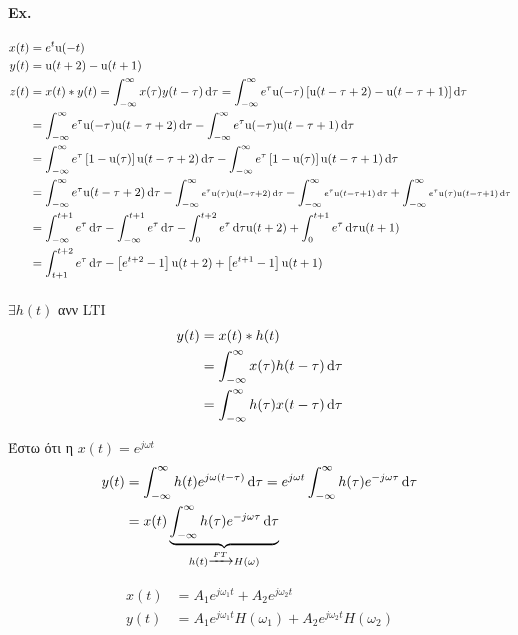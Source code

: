 	\paragraph{Ex.}
	\begin{align*}
	x(t) &= e^t\mathrm u(-t) \\
	y(t) &= \mathrm u(t+2)-\mathrm u(t+1) \\
	z(t) &= x(t) * y(t) = \int_{-\infty}^{\infty} x(\tau)y(t-\tau)\dif\tau
	= \int_{-\infty}^{\infty} e^\tau\mathrm u(-\tau)\left[
	\mathrm u(t-\tau+2)-\mathrm u(t-\tau+1)
	\right]\dif\tau
	\\ &= \int_{-\infty}^{\infty} e^\tau
	\mathrm u(-\tau)\mathrm u(t-\tau+2)\dif\tau - \int_{-\infty}^{\infty}
	e^\tau \mathrm u(-\tau)\mathrm u(t-\tau+1)\dif\tau
	\\ &= \int_{-\infty}^{\infty} e^\tau
	\left[ 1-\mathrm u(\tau) \right]\mathrm u(t-\tau+2)\dif\tau -
	\int_{-\infty}^{\infty} e^\tau \left[ 1-\mathrm u(\tau) \right]
	\mathrm u(t-\tau+1)\dif\tau
	\\ &= \int_{-\infty}^{\infty}
	\mathsmaller{e^\tau \mathrm u(t-\tau+2)\dif\tau}
	- \int_{-\infty}^{\infty}
	\mathsmaller{\mathsmaller{
		 e^\tau \mathrm u(\tau) \mathrm u(t-\tau+2)\dif\tau}}
	- \int_{-\infty}^{\infty}
	\mathsmaller{\mathsmaller{ e^\tau \mathrm u(t-\tau+1)\dif\tau}}
	+ \int_{-\infty}^{\infty}\mathsmaller{\mathsmaller{
		 e^\tau \mathrm u(\tau)\mathrm u(t-\tau+1)\dif\tau}}
	\\ &= \int_{-\infty}^{t+1} e^\tau\dif\tau - \int_{-\infty}^{t+1}e^\tau\dif\tau
	- \int_0^{t+2}e^\tau\dif\tau\mathrm u(t+2)
	+ \int_0^{t+1}e^\tau\dif\tau \mathrm u(t+1)
	\\ &= \int_{t+1}^{t+2}e^\tau\dif\tau
	-\left[ e^{t+2}-1 \right]\mathrm u(t+2)
	+\left[ e^{t+1}-1 \right]\mathrm u(t+1)
	\end{align*}

	\vspace{1cm}
	\paragraph{}
	\( \exists h(t) \) ανν LTI
	\begin{align*}
		y(t) &= x(t)*h(t) \\ &=\int_{-\infty}^{\infty} x(\tau)h(t-\tau)\mathop{}\!\mathrm{d}\tau
		\\ &= \int_{-\infty}^{\infty} h(\tau)x(t-\tau)\mathop{}\!\mathrm{d}\tau
	\end{align*}

	Έστω ότι η \( x(t) = e^{j\omega t} \)
	\begin{align*}
	y(t) &= \int_{-\infty}^{\infty} h(t) e^{j\omega(t-\tau)}\dif\tau
	= e^{j\omega t} \int_{-\infty}^{\infty} h(\tau)e^{-j\omega\tau}\dif\tau
	\\ &= x(t)\underbrace{\int_{-\infty}^{\infty} h(\tau)e^{-j\omega\tau}\dif\tau}_{\mathclap{h(t) \xrightarrow{FT} H(\omega)}}
	\end{align*}

	\begin{align*}
	x(t) &= A_1e^{j\omega_1 t} + A_2e^{j\omega_2 t} \\
	y(t) &= A_1e^{j\omega_1 t}H(\omega_1)+A_2e^{j\omega_2t}H(\omega_2)
	\end{align*}
